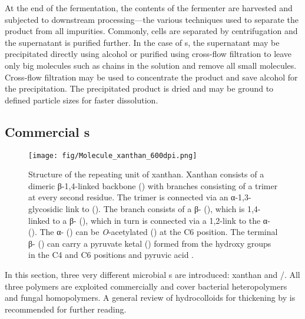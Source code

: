 At the end of the fermentation, the contents of the fermenter are harvested and subjected to downstream processing---the various techniques used to separate the product from all impurities. Commonly, cells are separated by centrifugation and the supernatant is purified further. In the case of \eps{}s, the supernatant may be precipitated directly using alcohol or purified using cross-flow filtration to leave only big molecules such as \eps{} chains in the solution and remove all small molecules. Cross-flow filtration may be used to concentrate the product and save alcohol for the precipitation. The precipitated product is dried and may be ground to defined particle sizes for faster dissolution.

\subsection{Commercial \EPS{}s\label{subsec-intro-eps-commercial}}
\begin{figure}
	\begin{center}
		\texttt{[image: fig/Molecule\_xanthan\_600dpi.png]}
		\caption[Structure of the Repeating Unit of Xanthan]{Structure of the repeating unit of xanthan. Xanthan consists of a dimeric β-1,4-linked \glc{} backbone (\circi{}) with branches consisting of a trimer at every second \glc{} residue. The trimer is connected via an α-1,3-glycosidic link to \man{} (\circii{}). The branch consists of a β-\man{} (\circiv{}), which is 1,4-linked to a β-\glcua{} (\circiii{}), which in turn is connected via a 1,2-link to the α-\man{} (\circii{}). The α-\man{} (\circii{}) can be \textit{O}-acetylated (\circv{}) at the C6 position. The terminal β-\man{} (\circiv{}) can carry a pyruvate ketal (\circvi{}) formed from the hydroxy groups in the C4 and C6 positions and pyruvic acid \cite{Jansson1975}.\label{fig-intro-eps-xanthan}}
	\end{center}
\end{figure}

In this section, three very different microbial \eps{}s are introduced: xanthan and \scl{}/\shz{}. All three polymers are exploited commercially and cover bacterial heteropolymers and fungal homopolymers. A general review of hydrocolloids for thickening by \textcite{Saha2010} is recommended for further reading.

